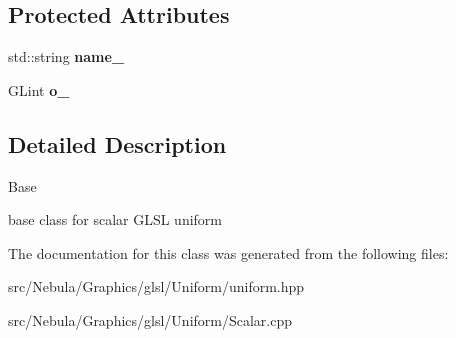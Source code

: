 \subsection*{\-Protected \-Attributes}
\begin{DoxyCompactItemize}
\item 
\hypertarget{classNeb_1_1glsl_1_1Uniform_1_1Scalar_1_1Base_af4f8e92fee448c545de153937a419abe}{std\-::string {\bfseries name\-\_\-}}\label{classNeb_1_1glsl_1_1Uniform_1_1Scalar_1_1Base_af4f8e92fee448c545de153937a419abe}

\item 
\hypertarget{classNeb_1_1glsl_1_1Uniform_1_1Scalar_1_1Base_ac57d0525c2866193e87adde9b8ef36fe}{\-G\-Lint {\bfseries o\-\_\-}}\label{classNeb_1_1glsl_1_1Uniform_1_1Scalar_1_1Base_ac57d0525c2866193e87adde9b8ef36fe}

\end{DoxyCompactItemize}


\subsection{\-Detailed \-Description}
\-Base 

base class for scalar \-G\-L\-S\-L uniform 

\-The documentation for this class was generated from the following files\-:\begin{DoxyCompactItemize}
\item 
src/\-Nebula/\-Graphics/glsl/\-Uniform/uniform.\-hpp\item 
src/\-Nebula/\-Graphics/glsl/\-Uniform/\-Scalar.\-cpp\end{DoxyCompactItemize}
